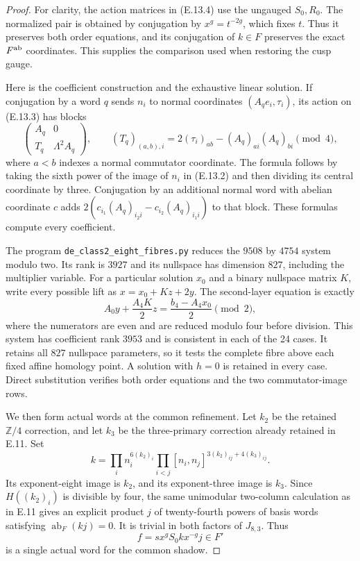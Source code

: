 \begin{proof}
For clarity, the action matrices in (E.13.4) use the
ungauged $S_0,R_0$. The normalized pair is obtained by
conjugation by $x^g=t^{-2g}$, which fixes $t$. Thus it
preserves both order equations, and its conjugation of
$k\in F$ preserves the exact $F^{\rm ab}$ coordinates.
This supplies the comparison used when restoring the
cusp gauge.

Here is the coefficient construction and the exhaustive
linear solution. If conjugation by a word $q$ sends $n_i$
to normal coordinates $(A_qe_i,\tau_i)$, its action on
(E.13.3) has blocks
\[
 \begin{pmatrix}
 A_q&0\\
 T_q&\Lambda^2A_q
 \end{pmatrix},\qquad
 (T_q)_{(a,b),i}=2(\tau_i)_{ab}-(A_q)_{ai}(A_q)_{bi}
                 \pmod4,
 \tag{E.13.5}
\]
where $a<b$ indexes a normal commutator coordinate.
The formula follows by taking the sixth power of the
image of $n_i$ in (E.13.2) and then dividing its central
coordinate by three. Conjugation by an additional normal
word with abelian coordinate $c$ adds
$2(c_{i_1}(A_q)_{i_2i}-c_{i_2}(A_q)_{i_1i})$
to that block. These formulas compute every coefficient.

The program \texttt{de\_class2\_eight\_fibres.py} reduces
the $9508$ by $4754$ system modulo two. Its rank is $3927$
and its nullspace has dimension $827$, including the
multiplier variable. For a particular solution $x_0$ and
a binary nullspace matrix $K$, write every possible lift
as $x=x_0+Kz+2y$. The second-layer equation is exactly
\[
 A_0y+\frac{A_4K}{2}z
         =\frac{b_4-A_4x_0}{2}\pmod2,
 \tag{E.13.6}
\]
where the numerators are even and are reduced modulo four
before division. This system has coefficient rank $3953$
and is consistent in each of the 24 cases. It retains all
$827$ nullspace parameters, so it tests the complete fibre
above each fixed affine homology point. A solution with
$h=0$ is retained in every case. Direct substitution verifies
both order equations and the two commutator-image rows.

We then form actual words at the common refinement. Let
$k_2$ be the retained $\mathbb Z/4$ correction, and let
$k_3$ be the three-primary correction already retained in
E.11. Set
\[
 k=\prod_i n_i^{6(k_2)_i}
       \prod_{i<j}[n_i,n_j]^{3(k_2)_{ij}+4(k_3)_{ij}}.
\]
Its exponent-eight image is $k_2$, and its exponent-three
image is $k_3$. Since $H((k_2)_i)$ is divisible by four,
the same unimodular two-column calculation as in E.11 gives
an explicit product $j$ of twenty-fourth powers of basis
words satisfying $\operatorname{ab}_F(kj)=0$. It is trivial
in both factors of $J_{8,3}$. Thus
\[
                  f=sx^gS_0k x^{-g}j\in F'
 \tag{E.13.7}
\]
is a single actual word for the common shadow.


\end{proof}

